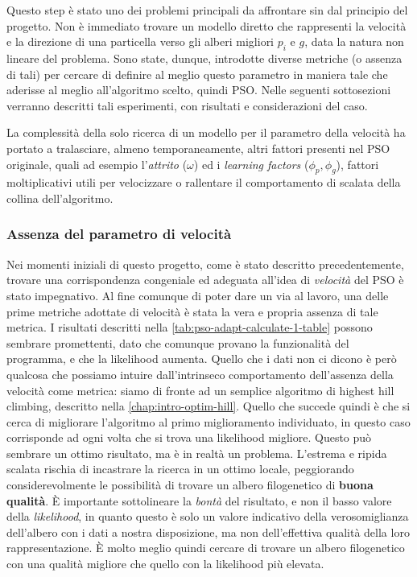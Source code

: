 Questo step è stato uno dei problemi principali da affrontare sin dal principio del progetto. Non è immediato trovare un modello diretto che rappresenti la velocità e la direzione di una particella verso gli alberi migliori $p_i$ e $g$, data la natura non lineare del problema. Sono state, dunque, introdotte diverse metriche (o assenza di tali) per cercare di definire al meglio questo parametro in maniera tale che aderisse al meglio all'algoritmo scelto, quindi PSO. Nelle seguenti sottosezioni verranno descritti tali esperimenti, con risultati e considerazioni del caso.

La complessità della solo ricerca di un modello per il parametro della velocità ha portato a tralasciare, almeno temporaneamente, altri fattori presenti nel PSO originale, quali ad esempio l'\textit{attrito} ($\omega$) ed i \textit{learning factors} ($\phi_p, \phi_g$), fattori moltiplicativi utili per velocizzare o rallentare il comportamento di scalata della collina dell'algoritmo.

\subsubsection{Assenza del parametro di velocità}
\label{chap:pso-adapt-calculate-1}
Nei momenti iniziali di questo progetto, come è stato descritto precedentemente, trovare una corrispondenza congeniale ed adeguata all'idea di \textit{velocità} del PSO è stato impegnativo. Al fine comunque di poter dare un via al lavoro, una delle prime metriche adottate di velocità è stata la vera e propria assenza di tale metrica. I risultati descritti nella \autoref{tab:pso-adapt-calculate-1-table} possono sembrare promettenti, dato che comunque provano la funzionalità del programma, e che la likelihood aumenta. Quello che i dati non ci dicono è però qualcosa che possiamo intuire dall'intrinseco comportamento dell'assenza della velocità come metrica: siamo di fronte ad un semplice algoritmo di highest hill climbing, descritto nella \autoref{chap:intro-optim-hill}. Quello che succede quindi è che si cerca di migliorare l'algoritmo al primo miglioramento individuato, in questo caso corrisponde ad ogni volta che si trova una likelihood migliore. Questo può sembrare un ottimo risultato, ma è in realtà un problema. L'estrema e ripida scalata rischia di incastrare la ricerca in un ottimo locale, peggiorando considerevolmente le possibilità di trovare un albero filogenetico di \textbf{buona qualità}. È importante sottolineare la \textit{bontà} del risultato, e non il basso valore della \textit{likelihood}, in quanto questo è solo un valore indicativo della verosomiglianza dell'albero con i dati a nostra disposizione, ma non dell'effettiva qualità della loro rappresentazione. È molto meglio quindi cercare di trovare un albero filogenetico con una qualità migliore che quello con la likelihood più elevata.

